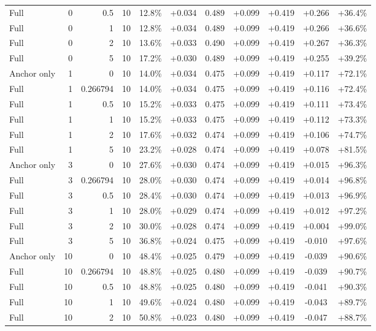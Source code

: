 \begin{table}[htbp]
\begin{tabular}{lrrrccccccc}
Full & 0 & 0.5 & 10 & 12.8\% & +0.034 & 0.489 & +0.099 & +0.419 & +0.266 & +36.4\% \\
Full & 0 & 1 & 10 & 12.8\% & +0.034 & 0.489 & +0.099 & +0.419 & +0.266 & +36.6\% \\
Full & 0 & 2 & 10 & 13.6\% & +0.033 & 0.490 & +0.099 & +0.419 & +0.267 & +36.3\% \\
Full & 0 & 5 & 10 & 17.2\% & +0.030 & 0.489 & +0.099 & +0.419 & +0.255 & +39.2\% \\
Anchor only & 1 & 0 & 10 & 14.0\% & +0.034 & 0.475 & +0.099 & +0.419 & +0.117 & +72.1\% \\
Full & 1 & 0.266794 & 10 & 14.0\% & +0.034 & 0.475 & +0.099 & +0.419 & +0.116 & +72.4\% \\
Full & 1 & 0.5 & 10 & 15.2\% & +0.033 & 0.475 & +0.099 & +0.419 & +0.111 & +73.4\% \\
Full & 1 & 1 & 10 & 15.2\% & +0.033 & 0.475 & +0.099 & +0.419 & +0.112 & +73.3\% \\
Full & 1 & 2 & 10 & 17.6\% & +0.032 & 0.474 & +0.099 & +0.419 & +0.106 & +74.7\% \\
Full & 1 & 5 & 10 & 23.2\% & +0.028 & 0.474 & +0.099 & +0.419 & +0.078 & +81.5\% \\
Anchor only & 3 & 0 & 10 & 27.6\% & +0.030 & 0.474 & +0.099 & +0.419 & +0.015 & +96.3\% \\
Full & 3 & 0.266794 & 10 & 28.0\% & +0.030 & 0.474 & +0.099 & +0.419 & +0.014 & +96.8\% \\
Full & 3 & 0.5 & 10 & 28.4\% & +0.030 & 0.474 & +0.099 & +0.419 & +0.013 & +96.9\% \\
Full & 3 & 1 & 10 & 28.0\% & +0.029 & 0.474 & +0.099 & +0.419 & +0.012 & +97.2\% \\
Full & 3 & 2 & 10 & 30.0\% & +0.028 & 0.474 & +0.099 & +0.419 & +0.004 & +99.0\% \\
Full & 3 & 5 & 10 & 36.8\% & +0.024 & 0.475 & +0.099 & +0.419 & -0.010 & +97.6\% \\
Anchor only & 10 & 0 & 10 & 48.4\% & +0.025 & 0.479 & +0.099 & +0.419 & -0.039 & +90.6\% \\
Full & 10 & 0.266794 & 10 & 48.8\% & +0.025 & 0.480 & +0.099 & +0.419 & -0.039 & +90.7\% \\
Full & 10 & 0.5 & 10 & 48.8\% & +0.025 & 0.480 & +0.099 & +0.419 & -0.041 & +90.3\% \\
Full & 10 & 1 & 10 & 49.6\% & +0.024 & 0.480 & +0.099 & +0.419 & -0.043 & +89.7\% \\
Full & 10 & 2 & 10 & 50.8\% & +0.023 & 0.480 & +0.099 & +0.419 & -0.047 & +88.7\% \\

\end{tabular}
\end{table}
